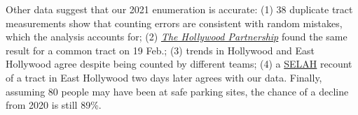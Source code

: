 \documentclass[11pt]{article}
\def\selah{SELAH}
\begin{document}
Other data suggest that our 2021 enumeration is accurate: (1) 38 duplicate tract measurements 
show that counting errors are consistent with random mistakes, which the analysis accounts for; (2) 
\href{https://hollywoodpartnership.com/}{\it The Hollywood Partnership} found the same result for
a common tract on 19 Feb.; (3) trends in Hollywood and East Hollywood agree despite being counted 
by different teams; (4) a \href{https://selahnch.org}{\selah} recount of a tract in East Hollywood two 
days later agrees with our data. Finally, assuming 80 people may have been at safe parking sites, the 
chance of a decline from 2020 is still 89\%.\\
\end{document}

